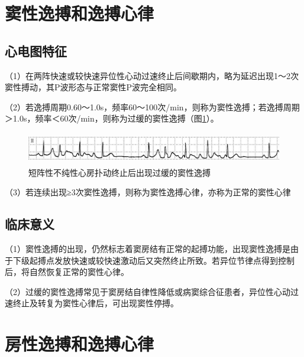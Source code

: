 \section{窦性逸搏和逸搏心律}

\protect\hypertarget{text00019.htmlux5cux23subid174}{}{}

\subsection{心电图特征}

（1）在两阵快速或较快速异位性心动过速终止后间歇期内，略为延迟出现1～2次窦性搏动，其P波形态与正常窦性P波完全相同。

（2）若逸搏周期0.60～1.0s，频率60～100次/min，则称为窦性逸搏；若逸搏周期＞1.0s，频率＜60次/min，则称为过缓的窦性逸搏（图\ref{fig12-1}）。

\begin{figure}[!htbp]
 \centering
 \includegraphics[width=5.79167in,height=0.55208in]{./images/Image00194.jpg}
 \captionsetup{justification=centering}
 \caption{短阵性不纯性心房扑动终止后出现过缓的窦性逸搏}
 \label{fig12-1}
  \end{figure} 

（3）若连续出现≥3次窦性逸搏，则称为窦性逸搏心律，亦称为正常的窦性心律

\protect\hypertarget{text00019.htmlux5cux23subid175}{}{}

\subsection{临床意义}

（1）窦性逸搏的出现，仍然标志着窦房结有正常的起搏功能，出现窦性逸搏是由于下级起搏点发放快速或较快速激动后又突然终止所致。若异位节律点得到控制后，将自然恢复正常的窦性心律。

（2）过缓的窦性逸搏常见于窦房结自律性降低或病窦综合征患者，异位性心动过速终止及转复为窦性心律后，可出现窦性停搏。

\protect\hypertarget{text00019.htmlux5cux23subid176}{}{}

\section{房性逸搏和逸搏心律}

\protect\hypertarget{text00019.htmlux5cux23subid177}{}{}

